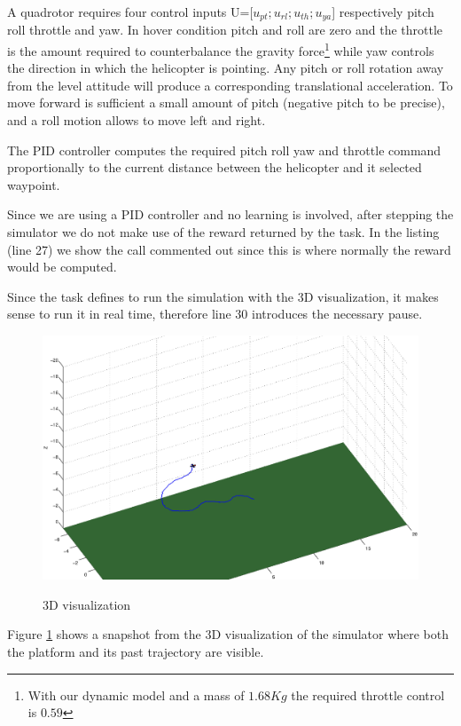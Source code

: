 \documentclass[a4paper,11pt]{report}
\begin{document}
A quadrotor requires four control inputs U=[$u_{pt};u_{rl};u_{th};u_{ya}$] respectively pitch roll throttle and yaw.
In hover condition pitch and roll are zero and the throttle is the amount required to counterbalance the gravity force\footnote{With our dynamic model and a mass of $1.68Kg$ the required throttle control is $0.59$} while yaw controls the direction in which the helicopter is pointing.  
Any pitch or roll rotation away from the level attitude will produce a corresponding translational acceleration. To move forward is sufficient a small amount of pitch (negative pitch to be precise), and a roll motion allows to move left and right. 

The PID controller computes the required pitch roll yaw and throttle command proportionally to the current distance between the helicopter and it selected waypoint.

Since we are using a PID controller and no learning is involved, after stepping the simulator we do not make use of the reward returned by the task. In the listing (line 27) we show the call commented out since this is where normally the reward would be computed.

Since the task defines to run the simulation with the 3D visualization, it makes sense to run it in real time, therefore line 30 introduces the necessary pause.  

\begin{figure}
\begin{center}
\label{fig:3d}
\includegraphics[width=13cm]{./3d.eps}
 \caption{3D visualization}
\end{center}
\end{figure}

Figure \ref{fig:3d} shows a snapshot from the 3D visualization of the simulator where both the platform and its past trajectory are visible.
\end{document}
